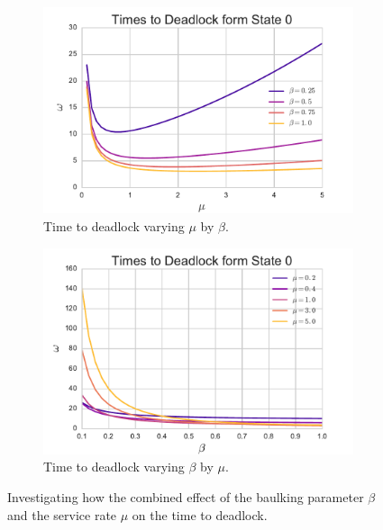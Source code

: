 \documentclass{article}
\begin{document}
\begin{figure}[!hbtp]
\begin{center}
\begin{subfigure}[b]{0.45\textwidth}
    \includegraphics[width=\textwidth]{img/varymu_bybeta.pdf}
    \caption{Time to deadlock varying $\mu$ by $\beta$.}
    \label{fig:varymubybeta}
\end{subfigure}
\begin{subfigure}[b]{0.45\textwidth}
    \includegraphics[width=\textwidth]{img/varybeta_bymu.pdf}
    \caption{Time to deadlock varying $\beta$ by $\mu$.}
    \label{fig:varybetabymu}
\end{subfigure}
\end{center}
\caption{Investigating how the combined effect of the baulking parameter $\beta$ and the service rate $\mu$ on the time to deadlock.}
\label{fig:combinedeffect_betamu}
\end{figure}
\end{document}
